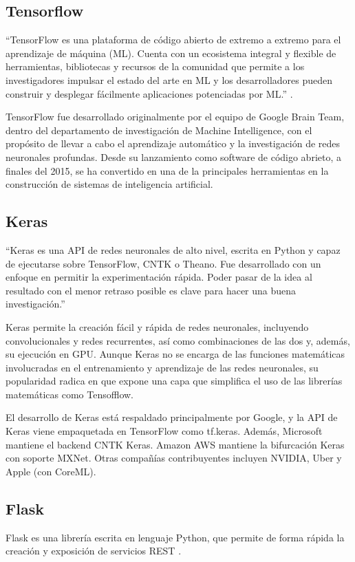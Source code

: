     \subsection{Tensorflow}
    \label{sub:FrameTensorflow}
        ``TensorFlow es una plataforma de código abierto de extremo a extremo para el aprendizaje de máquina (ML). Cuenta con un ecosistema integral y flexible de herramientas, bibliotecas y recursos de la comunidad que permite a los investigadores impulsar el estado del arte en ML y los desarrolladores pueden construir y desplegar fácilmente aplicaciones potenciadas por ML.'' \cite{GoogleTF2019}.

        TensorFlow fue desarrollado originalmente por el equipo de Google Brain Team, dentro del departamento de investigación de Machine Intelligence, con el propósito de llevar a cabo el aprendizaje automático y la investigación de redes neuronales profundas. Desde su lanzamiento como software de código abrieto, a finales del 2015, se ha convertido en una de la principales herramientas en la construcción de sistemas de inteligencia artificial.
        
    \subsection{Keras}
    \label{sub:FrameKeras}
        ``Keras es una API de redes neuronales de alto nivel, escrita en Python y capaz de ejecutarse sobre TensorFlow, CNTK o Theano. Fue desarrollado con un enfoque en permitir la experimentación rápida. Poder pasar de la idea al resultado con el menor retraso posible es clave para hacer una buena investigación.''
        
        Keras permite la creación fácil y rápida de redes neuronales, incluyendo convolucionales y redes recurrentes, así como combinaciones de las dos y, además, su ejecución en GPU. Aunque Keras no se encarga de las funciones matemáticas involucradas en el entrenamiento y aprendizaje de las redes neuronales, su popularidad radica en que expone una capa que simplifica el uso de las librerías matemáticas como Tensofflow.
        
        El desarrollo de Keras está respaldado principalmente por Google, y la API de Keras viene empaquetada en TensorFlow como tf.keras. Además, Microsoft mantiene el backend CNTK Keras. Amazon AWS mantiene la bifurcación Keras con soporte MXNet. Otras compañías contribuyentes incluyen NVIDIA, Uber y Apple (con CoreML).
        
    \subsection{Flask}
    \label{sub:FrameFlask}
        Flask es una librería escrita en lenguaje Python, que permite de forma rápida la creación y exposición de servicios REST \cite{Flask2019}.
        
